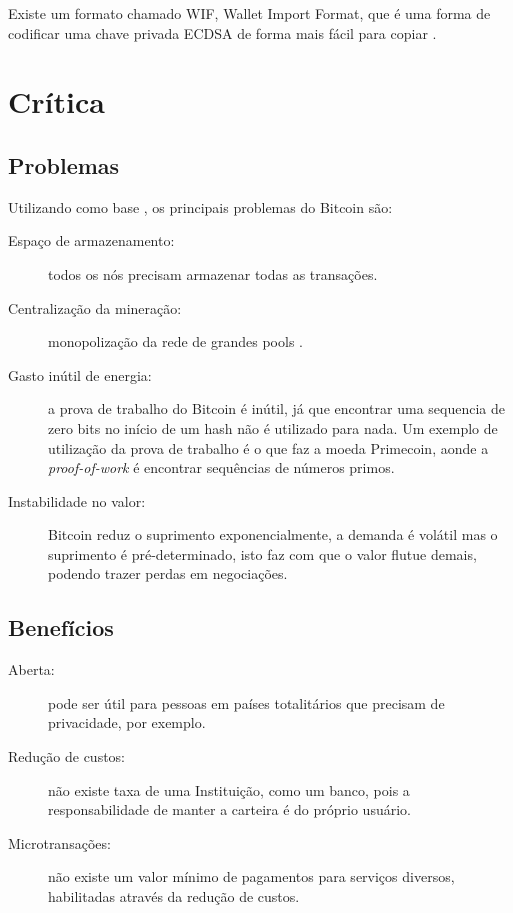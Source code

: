\documentclass[a4paper,11pt]{article}
\theoremstyle{mytheor}
\begin{document}
Existe um formato chamado WIF, Wallet Import Format, que é uma forma de codificar uma chave privada ECDSA de forma mais fácil para copiar \cite{wif}. 

\section*{Crítica}

\subsection*{Problemas}
Utilizando como base \cite{hardProblems}, os principais problemas do Bitcoin são:

\begin{description}
\item[Espaço de armazenamento:] todos os nós precisam armazenar todas as transações.
\item[Centralização da mineração:] monopolização da rede de grandes pools \cite{pools}.
\item[Gasto inútil de energia:] a prova de trabalho do Bitcoin é inútil, já que encontrar uma sequencia de zero bits no início de um hash não é utilizado para nada. Um exemplo de utilização da prova de trabalho é o que faz a moeda Primecoin, aonde a \textit{proof-of-work} é encontrar sequências de números primos.

\item[Instabilidade no valor:] Bitcoin reduz o suprimento exponencialmente, a demanda é volátil mas o suprimento é pré-determinado, isto faz com que o valor flutue demais, podendo trazer perdas em negociações.
    \end{description}

\subsection*{Benefícios}
\begin{description}
    \item[Aberta:] pode ser útil para pessoas em países totalitários que precisam de privacidade, por exemplo. 

\item[Redução de custos:] não existe taxa de uma Instituição, como um banco, pois a responsabilidade de manter a carteira é do próprio usuário.
\item[Microtransações:] não existe um valor mínimo de pagamentos para serviços diversos, habilitadas através da redução de custos.
\end{description}
\end{document}
